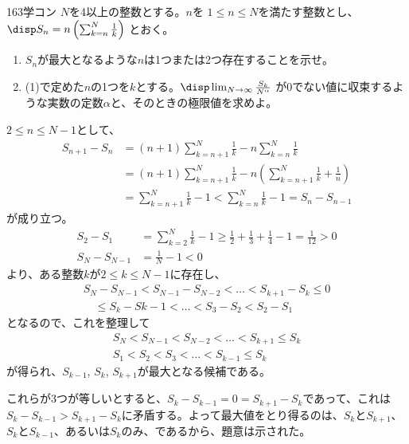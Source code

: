\begin{thm}{163}{\maru}{学コン}
 $N$を4以上の整数とする。$n$を $1\le n \le N$を満たす整数とし、$\disp S_n=n\left(\sum_{k=n}^N \frac{1}{k}\right)$ とおく。
 \begin{enumerate}
  \item $S_n$が最大となるような$n$は1つまたは2つ存在することを示せ。
  \item (1)で定めた$n$の1つを$k$とする。$\disp \lim_{N\to\infty} \frac{S_k}{N^\alpha}$ が0でない値に収束するような実数の定数$\alpha$と、そのときの極限値を求めよ。
 \end{enumerate}
\end{thm}

$2\le n\le N-1$として、
\begin{align*}
 S_{n+1}-S_n&=(n+1)\sum_{k=n+1}^N\frac{1}{k}-n\sum_{k=n}^N\frac{1}{k} \\
 &=(n+1)\sum_{k=n+1}^N\frac{1}{k}-n\left(\sum_{k=n+1}^N\frac{1}{k}+\frac{1}{n}\right) \\
 &=\sum_{k=n+1}^N\frac{1}{k}-1 < \sum_{k=n}^N\frac{1}{k}-1 = S_n-S_{n-1}
\end{align*}
が成り立つ。
\begin{align*}
 S_2-S_1&=\sum_{k=2}^N\frac{1}{k} -1 \ge \frac{1}{2}+\frac{1}{3}+\frac{1}{4}-1=\frac{1}{12}>0 \\
 S_N-S_{N-1}&=\frac{1}{N}-1 < 0
\end{align*}
より、ある整数$k$が$2\le k\le N-1$に存在し、
\begin{align*}
 S_N-S_{N-1}<S_{N-1}-S_{N-2}<\dots <S_{k+1}-S_{k}\le 0 \\
 \quad \le S_{k}-S{k-1}<\dots <S_3-S_2<S_2-S_1
\end{align*}
となるので、これを整理して
\begin{align*}
 S_N<S_{N-1}<S_{N-2}<\dots<S_{k+1}\le S_k \\
 S_1<S_2<S_3<\dots<S_{k-1}\le S_k
\end{align*}
が得られ、$S_{k-1}$, $S_k$, $S_{k+1}$が最大となる候補である。

これらが3つが等しいとすると、$S_k-S_{k-1}=0=S_{k+1}-S_k$であって、これは$S_k-S_{k-1}>S_{k+1}-S_k$に矛盾する。よって最大値をとり得るのは、$S_k$と$S_{k+1}$、$S_k$と$S_{k-1}$、あるいは$S_k$のみ、であるから、題意は示された。

